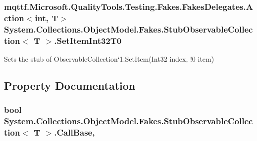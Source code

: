 \hypertarget{class_system_1_1_collections_1_1_object_model_1_1_fakes_1_1_stub_observable_collection_3_01_t_01_4_abc1342da426c3f1435f43a3448566827}{
\subsubsection[{Set\-Item\-Int32\-T0}]{\setlength{\rightskip}{0pt plus 5cm}mqttf.\-Microsoft.\-Quality\-Tools.\-Testing.\-Fakes.\-Fakes\-Delegates.\-Action$<$int, T$>$ System.\-Collections.\-Object\-Model.\-Fakes.\-Stub\-Observable\-Collection$<$ T $>$.Set\-Item\-Int32\-T0}}\label{class_system_1_1_collections_1_1_object_model_1_1_fakes_1_1_stub_observable_collection_3_01_t_01_4_abc1342da426c3f1435f43a3448566827}


Sets the stub of Observable\-Collection`1.Set\-Item(Int32 index, !0 item)



\subsection{Property Documentation}
\hypertarget{class_system_1_1_collections_1_1_object_model_1_1_fakes_1_1_stub_observable_collection_3_01_t_01_4_ac4f4b22c6a3f92bc29eb4119ccd3fdbe}{
\subsubsection[{Call\-Base}]{\setlength{\rightskip}{0pt plus 5cm}bool System.\-Collections.\-Object\-Model.\-Fakes.\-Stub\-Observable\-Collection$<$ T $>$.Call\-Base\hspace{0.3cm}{\ttfamily [get]}, {\ttfamily [set]}}}\label{class_system_1_1_collections_1_1_object_model_1_1_fakes_1_1_stub_observable_collection_3_01_t_01_4_ac4f4b22c6a3f92bc29eb4119ccd3fdbe}



